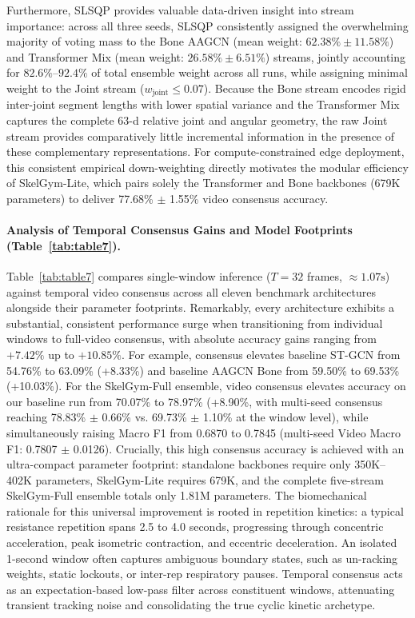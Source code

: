 \documentclass[runningheads]{llncs}
\begin{document}
Furthermore, SLSQP provides valuable data-driven insight into stream importance: across all three seeds, SLSQP consistently assigned the overwhelming majority of voting mass to the Bone AAGCN (mean weight: $62.38\% \pm 11.58\%$) and Transformer Mix (mean weight: $26.58\% \pm 6.51\%$) streams, jointly accounting for $82.6\%\text{--}92.4\%$ of total ensemble weight across all runs, while assigning minimal weight to the Joint stream ($w_{\text{joint}} \le 0.07$). Because the Bone stream encodes rigid inter-joint segment lengths with lower spatial variance and the Transformer Mix captures the complete 63-d relative joint and angular geometry, the raw Joint stream provides comparatively little incremental information in the presence of these complementary representations. For compute-constrained edge deployment, this consistent empirical down-weighting directly motivates the modular efficiency of SkelGym-Lite, which pairs solely the Transformer and Bone backbones (679K parameters) to deliver 77.68\% $\pm$ 1.55\% video consensus accuracy.

\paragraph{Analysis of Temporal Consensus Gains and Model Footprints (Table~\ref{tab:table7}).} Table~\ref{tab:table7} compares single-window inference ($T=32$ frames, $\approx 1.07\text{s}$) against temporal video consensus across all eleven benchmark architectures alongside their parameter footprints. Remarkably, every architecture exhibits a substantial, consistent performance surge when transitioning from individual windows to full-video consensus, with absolute accuracy gains ranging from $+7.42\%$ up to $+10.85\%$. For example, consensus elevates baseline ST-GCN from 54.76\% to 63.09\% (+8.33\%) and baseline AAGCN Bone from 59.50\% to 69.53\% (+10.03\%). For the SkelGym-Full ensemble, video consensus elevates accuracy on our baseline run from 70.07\% to 78.97\% (+8.90\%, with multi-seed consensus reaching 78.83\% $\pm$ 0.66\% vs. 69.73\% $\pm$ 1.10\% at the window level), while simultaneously raising Macro F1 from 0.6870 to 0.7845 (multi-seed Video Macro F1: 0.7807 $\pm$ 0.0126). Crucially, this high consensus accuracy is achieved with an ultra-compact parameter footprint: standalone backbones require only 350K--402K parameters, SkelGym-Lite requires 679K, and the complete five-stream SkelGym-Full ensemble totals only 1.81M parameters. The biomechanical rationale for this universal improvement is rooted in repetition kinetics: a typical resistance repetition spans 2.5 to 4.0 seconds, progressing through concentric acceleration, peak isometric contraction, and eccentric deceleration. An isolated 1-second window often captures ambiguous boundary states, such as un-racking weights, static lockouts, or inter-rep respiratory pauses. Temporal consensus acts as an expectation-based low-pass filter across constituent windows, attenuating transient tracking noise and consolidating the true cyclic kinetic archetype.
\end{document}
